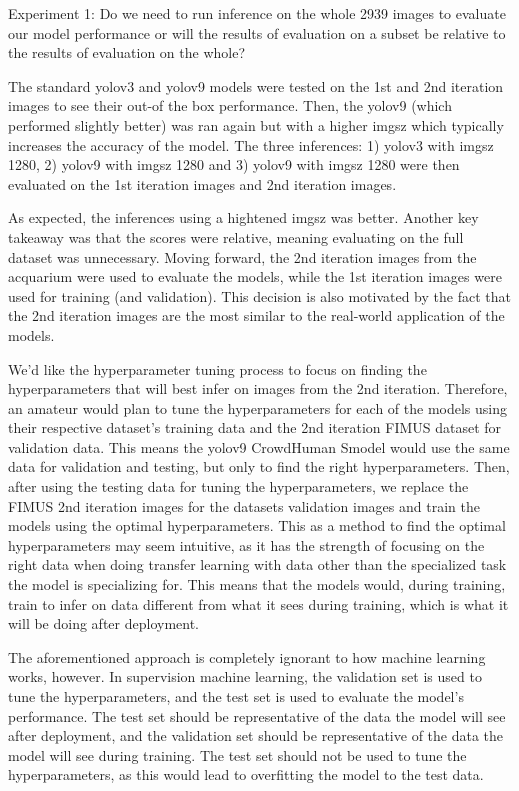 Experiment 1: Do we need to run inference on the whole 2939 images to evaluate our model performance or will the results of evaluation on a subset be relative to the results of evaluation on the whole?

The standard yolov3 and yolov9 models were tested on the 1st and 2nd iteration images to see their out-of the box performance. Then, the yolov9 (which performed slightly better) was ran again but with a higher imgsz which typically increases the accuracy of the model. The three inferences: 1) yolov3 with imgsz 1280, 2) yolov9 with imgsz 1280 and 3) yolov9 with imgsz 1280 were then evaluated on the 1st iteration images and 2nd iteration images.

As expected, the inferences using a hightened imgsz was better. Another key takeaway was that the scores were relative, meaning evaluating on the full dataset was unnecessary. Moving forward, the 2nd iteration images from the acquarium were used to evaluate the models, while the 1st iteration images were used for training (and validation). This decision is also motivated by the fact that the 2nd iteration images are the most similar to the real-world application of the models.

We'd like the hyperparameter tuning process to focus on finding the hyperparameters that will best infer on images from the 2nd iteration. Therefore, an amateur would plan to tune the hyperparameters for each of the models using their respective dataset's training data and the 2nd iteration FIMUS dataset for validation data. This means the yolov9 CrowdHuman Smodel would use the same data for validation and testing, but only to find the right hyperparameters. Then, after using the testing data for tuning the hyperparameters, we replace the FIMUS 2nd iteration images for the datasets validation images and train the models using the optimal hyperparameters. This as a method to find the optimal hyperparameters may seem intuitive, as it has the strength of focusing on the right data when doing transfer learning with data other than the specialized task the model is specializing for. This means that the models would, during training, train to infer on data different from what it sees during training, which is what it will be doing after deployment.

The aforementioned approach is completely ignorant to how machine learning works, however. In supervision machine learning, the validation set is used to tune the hyperparameters, and the test set is used to evaluate the model's performance. The test set should be representative of the data the model will see after deployment, and the validation set should be representative of the data the model will see during training. The test set should not be used to tune the hyperparameters, as this would lead to overfitting the model to the test data.

